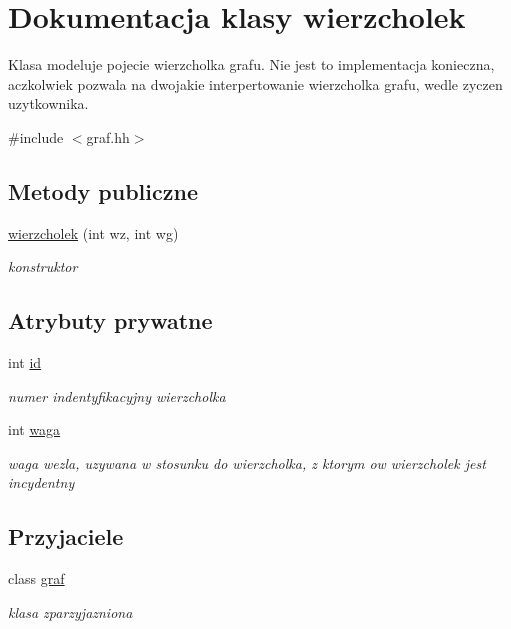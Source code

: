 \hypertarget{classwierzcholek}{\section{Dokumentacja klasy wierzcholek}
\label{classwierzcholek}
}


Klasa modeluje pojecie wierzcholka grafu. Nie jest to implementacja konieczna, aczkolwiek pozwala na dwojakie interpertowanie wierzcholka grafu, wedle zyczen uzytkownika.  




{\ttfamily \#include $<$graf.\-hh$>$}

\subsection*{Metody publiczne}
\begin{DoxyCompactItemize}
\item 
\hyperlink{classwierzcholek_a04bee94b3f5b84064bf8dc16bf8b87f1}{wierzcholek} (int wz, int wg)
\begin{DoxyCompactList}\small\item\em konstruktor \end{DoxyCompactList}\end{DoxyCompactItemize}
\subsection*{Atrybuty prywatne}
\begin{DoxyCompactItemize}
\item 
int \hyperlink{classwierzcholek_ada68383887e4523b766e2c1e5ab6fa6e}{id}
\begin{DoxyCompactList}\small\item\em numer indentyfikacyjny wierzcholka \end{DoxyCompactList}\item 
int \hyperlink{classwierzcholek_a3c53d7c09f6e83be8808bd78d6221e08}{waga}
\begin{DoxyCompactList}\small\item\em waga wezla, uzywana w stosunku do wierzcholka, z ktorym ow wierzcholek jest incydentny \end{DoxyCompactList}\end{DoxyCompactItemize}
\subsection*{Przyjaciele}
\begin{DoxyCompactItemize}
\item 
class \hyperlink{classwierzcholek_a1726ca1919686bdccbca505bacf6de2f}{graf}
\begin{DoxyCompactList}\small\item\em klasa zparzyjazniona \end{DoxyCompactList}\end{DoxyCompactItemize}


